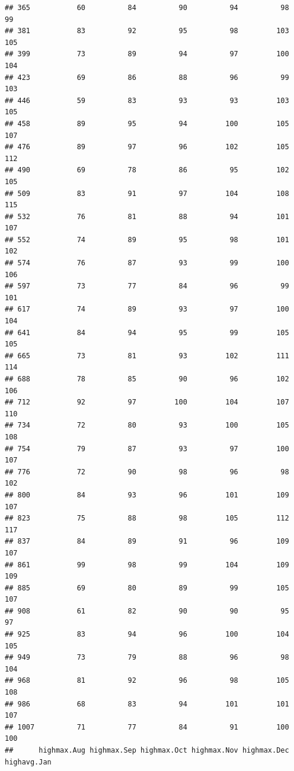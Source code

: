 \documentclass[
]{article}
\begin{document}
\begin{verbatim}
## 365           60          84          90          94          98          99
## 381           83          92          95          98         103         105
## 399           73          89          94          97         100         104
## 423           69          86          88          96          99         103
## 446           59          83          93          93         103         105
## 458           89          95          94         100         105         107
## 476           89          97          96         102         105         112
## 490           69          78          86          95         102         105
## 509           83          91          97         104         108         115
## 532           76          81          88          94         101         107
## 552           74          89          95          98         101         102
## 574           76          87          93          99         100         106
## 597           73          77          84          96          99         101
## 617           74          89          93          97         100         104
## 641           84          94          95          99         105         105
## 665           73          81          93         102         111         114
## 688           78          85          90          96         102         106
## 712           92          97         100         104         107         110
## 734           72          80          93         100         105         108
## 754           79          87          93          97         100         107
## 776           72          90          98          96          98         102
## 800           84          93          96         101         109         107
## 823           75          88          98         105         112         117
## 837           84          89          91          96         109         107
## 861           99          98          99         104         109         109
## 885           69          80          89          99         105         107
## 908           61          82          90          90          95          97
## 925           83          94          96         100         104         105
## 949           73          79          88          96          98         104
## 968           81          92          96          98         105         108
## 986           68          83          94         101         101         107
## 1007          71          77          84          91         100         100
##      highmax.Aug highmax.Sep highmax.Oct highmax.Nov highmax.Dec highavg.Jan

\end{verbatim}
\end{document}
